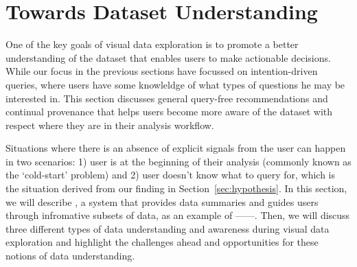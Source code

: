 \section{Towards Dataset Understanding\label{sec:understanding}}
One of the key goals of visual data exploration is to promote a better understanding of the dataset that enables users to make actionable decisions. While our focus in the previous sections have focussed on intention-driven queries, where users have some knowleldge of what types of questions he may be interested in. This section discusses general query-free recommendations and continual provenance that helps users become more aware of the dataset with respect where they are in their analysis workflow. 
\par Situations where there is an absence of explicit signals from the user can happen in two scenarios: 1) user is at the beginning of their analysis (commonly known as the `cold-start' problem) and 2) user doesn't know what to query for, which is the situation derived from our \zv finding in Section~\ref{sec:hypothesis}. In this section, we will describe \sbd, a system that provides data summaries and guides users through infromative subsets of data, as an example of ------. Then, we will discuss three different types of data understanding and awareness during visual data exploration and highlight the challenges ahead and opportunities for these notions of data understanding.
